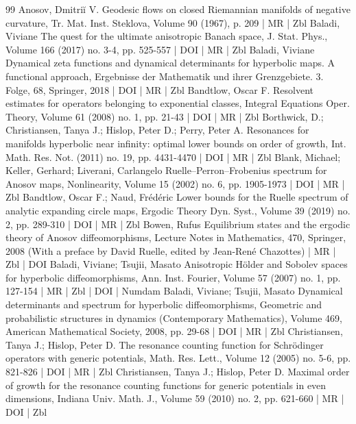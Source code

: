 \begin{thebibliography}{99}
 Anosov, Dmitriĭ V. Geodesic flows on closed Riemannian manifolds of negative curvature, Tr. Mat. Inst. Steklova, Volume 90 (1967), p. 209 | MR | Zbl
 Baladi, Viviane The quest for the ultimate anisotropic Banach space, J. Stat. Phys., Volume 166 (2017) no. 3-4, pp. 525-557 | DOI | MR | Zbl
 Baladi, Viviane Dynamical zeta functions and dynamical determinants for hyperbolic maps. A functional approach, Ergebnisse der Mathematik und ihrer Grenzgebiete. 3. Folge, 68, Springer, 2018 | DOI | MR | Zbl
 Bandtlow, Oscar F. Resolvent estimates for operators belonging to exponential classes, Integral Equations Oper. Theory, Volume 61 (2008) no. 1, pp. 21-43 | DOI | MR | Zbl
 Borthwick, D.; Christiansen, Tanya J.; Hislop, Peter D.; Perry, Peter A. Resonances for manifolds hyperbolic near infinity: optimal lower bounds on order of growth, Int. Math. Res. Not. (2011) no. 19, pp. 4431-4470 | DOI | MR | Zbl
 Blank, Michael; Keller, Gerhard; Liverani, Carlangelo Ruelle–Perron–Frobenius spectrum for Anosov maps, Nonlinearity, Volume 15 (2002) no. 6, pp. 1905-1973 | DOI | MR | Zbl
 Bandtlow, Oscar F.; Naud, Frédéric Lower bounds for the Ruelle spectrum of analytic expanding circle maps, Ergodic Theory Dyn. Syst., Volume 39 (2019) no. 2, pp. 289-310 | DOI | MR | Zbl
 Bowen, Rufus Equilibrium states and the ergodic theory of Anosov diffeomorphisms, Lecture Notes in Mathematics, 470, Springer, 2008 (With a preface by David Ruelle, edited by Jean-René Chazottes) | MR | Zbl | DOI
 Baladi, Viviane; Tsujii, Masato Anisotropic Hölder and Sobolev spaces for hyperbolic diffeomorphisms, Ann. Inst. Fourier, Volume 57 (2007) no. 1, pp. 127-154 | MR | Zbl | DOI | Numdam
 Baladi, Viviane; Tsujii, Masato Dynamical determinants and spectrum for hyperbolic diffeomorphisms, Geometric and probabilistic structures in dynamics (Contemporary Mathematics), Volume 469, American Mathematical Society, 2008, pp. 29-68 | DOI | MR | Zbl
 Christiansen, Tanya J.; Hislop, Peter D. The resonance counting function for Schrödinger operators with generic potentials, Math. Res. Lett., Volume 12 (2005) no. 5-6, pp. 821-826 | DOI | MR | Zbl
 Christiansen, Tanya J.; Hislop, Peter D. Maximal order of growth for the resonance counting functions for generic potentials in even dimensions, Indiana Univ. Math. J., Volume 59 (2010) no. 2, pp. 621-660 | MR | DOI | Zbl

\end{thebibliography}
